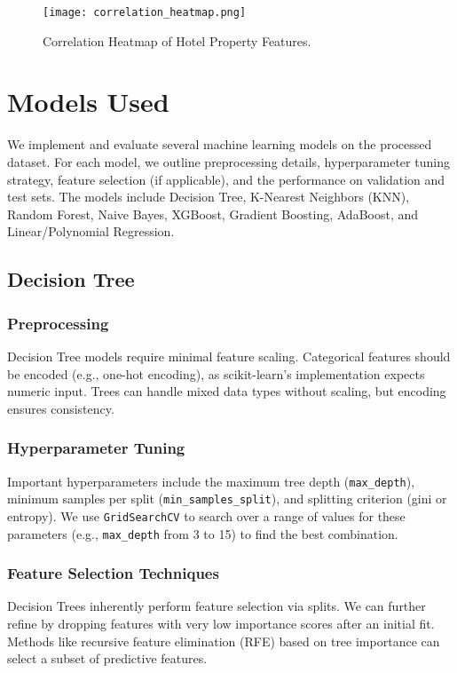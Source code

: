 \documentclass[12pt]{article}
\begin{document}
\begin{figure}[H]
    \centering
    \texttt{[image: correlation\_heatmap.png]}
    \caption{Correlation Heatmap of Hotel Property Features.}
    \label{fig:correlation}
\end{figure}

\section{Models Used}
We implement and evaluate several machine learning models on the processed dataset. For each model, we outline preprocessing details, hyperparameter tuning strategy, feature selection (if applicable), and the performance on validation and test sets. The models include Decision Tree, K-Nearest Neighbors (KNN), Random Forest, Naive Bayes, XGBoost, Gradient Boosting, AdaBoost, and Linear/Polynomial Regression.

\subsection{Decision Tree}
\subsubsection{Preprocessing}
Decision Tree models require minimal feature scaling. Categorical features should be encoded (e.g., one-hot encoding), as scikit-learn's implementation expects numeric input. Trees can handle mixed data types without scaling, but encoding ensures consistency.
\subsubsection{Hyperparameter Tuning}
Important hyperparameters include the maximum tree depth (\texttt{max\_depth}), minimum samples per split (\texttt{min\_samples_split}), and splitting criterion (gini or entropy). We use \texttt{GridSearchCV} to search over a range of values for these parameters (e.g., \texttt{max\_depth} from 3 to 15) to find the best combination.
\subsubsection{Feature Selection Techniques}
Decision Trees inherently perform feature selection via splits. We can further refine by dropping features with very low importance scores after an initial fit. Methods like recursive feature elimination (RFE) based on tree importance can select a subset of predictive features.
\end{document}
